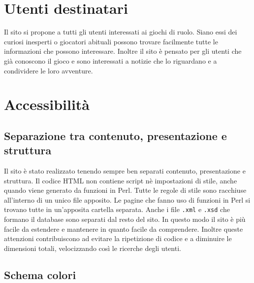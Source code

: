 \documentclass{article}
\begin{document}

\section{Utenti destinatari}
	Il sito si propone a tutti gli utenti interessati ai giochi di ruolo. Siano essi dei curiosi inesperti o giocatori 
	abituali possono trovare facilmente tutte le informazioni che possono interessare. Inoltre il sito è pensato per gli
	utenti che già conoscono il gioco e sono interessati a notizie che lo riguardano e a condividere le loro avventure.


\section{Accessibilità}

\subsection{Separazione tra contenuto, presentazione e struttura}
	Il sito è stato realizzato tenendo sempre ben separati contenuto, presentazione e struttura.
	Il codice HTML non contiene script nè impostazioni di stile, anche quando viene generato da funzioni in Perl.
	Tutte le regole di stile sono racchiuse all'interno di un unico file apposito.
	Le pagine che fanno uso di funzioni in Perl si trovano tutte in un'apposita cartella separata.
	Anche i file \texttt{.xml} e \texttt{.xsd} che formano il database sono separati dal resto del sito.
	In questo modo il sito è più facile da estendere e mantenere in quanto facile da comprendere.
	Inoltre queste attenzioni contribuiscono ad evitare la ripetizione di codice e a diminuire le dimensioni totali,
	velocizzando così le ricerche degli utenti.

\newpage
\subsection{Schema colori}
\end{document}
